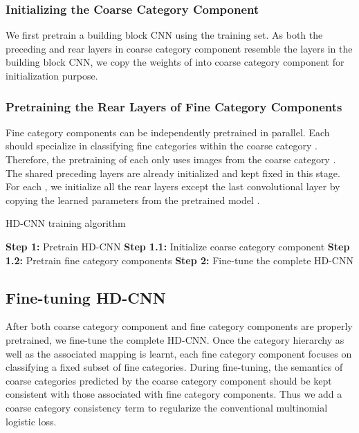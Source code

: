 \documentclass[10pt,twocolumn,letterpaper]{article}
\begin{document}
\subsubsection{Initializing the Coarse Category Component}
\label{sec:pretrain_coarse}
We first pretrain a building block CNN  using the training set. As both the preceding and rear layers in coarse category component resemble the layers in the building block CNN, we copy the weights of  into coarse category component for initialization purpose.




\subsubsection{Pretraining the Rear Layers of Fine Category Components}
\label{sec:pretrain_fine}

Fine category components  can be independently pretrained in parallel. Each  should specialize in classifying fine categories within the coarse category . Therefore, the pretraining of each  only uses images  from the coarse category .
The shared preceding layers are already initialized and kept fixed in this stage. For each , we initialize all the rear layers except the last convolutional layer by copying the learned parameters from the pretrained model .



\begin{algorithm}[!t]
\label{alg:hdcnn_train}
\caption{HD-CNN training algorithm}\label{euclid}
\begin{algorithmic}[1]

\State \textbf{Step 1:} Pretrain HD-CNN
\State \hspace{\algorithmicindent}   \textbf{Step 1.1:} Initialize coarse category component
\State \hspace{\algorithmicindent}   \textbf{Step 1.2:} Pretrain fine category components
\State \textbf{Step 2:} Fine-tune the complete HD-CNN
\EndProcedure
\end{algorithmic}
\label{alg:hdcnn_training}
\end{algorithm}
\subsection{Fine-tuning HD-CNN}
\label{sec:finetune_hdcnn}
After both coarse category component and fine category components are properly pretrained, we fine-tune the complete HD-CNN. Once the category hierarchy as well as the associated mapping  is learnt, each fine category component focuses on classifying a fixed subset of fine categories. During fine-tuning, the semantics of coarse categories predicted by the coarse category component should be kept consistent with those associated with fine category components. Thus we add a coarse category consistency term to regularize the conventional multinomial logistic loss.
\end{document}
